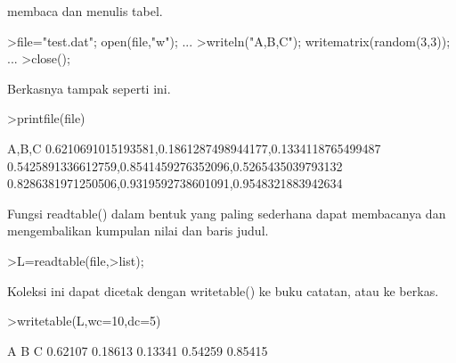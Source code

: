 \documentclass[a4paper,10pt]{article}
\begin{document}
\begin{eulernotebook}
\begin{eulercomment}
\begin{eulercomment}
\begin{eulercomment}
\begin{eulercomment}
\begin{eulercomment}
\begin{eulercomment}
\begin{eulercomment}
\begin{eulercomment}
\begin{eulercomment}
\begin{eulercomment}
\begin{eulercomment}
\begin{eulercomment}
\begin{eulercomment}
\begin{eulercomment}
\begin{eulercomment}
\begin{eulercomment}
\begin{eulercomment}
\begin{eulercomment}
\begin{eulercomment}
\begin{eulercomment}
\begin{eulercomment}
\begin{eulercomment}
\begin{eulercomment}
\begin{eulercomment}
\begin{eulercomment}
\begin{eulercomment}
\begin{eulercomment}
\begin{eulercomment}
\begin{eulercomment}
\begin{eulercomment}
\begin{eulercomment}
\begin{eulercomment}
\begin{eulercomment}
\begin{eulercomment}
\begin{eulercomment}
\begin{eulercomment}
\begin{eulercomment}
\begin{eulercomment}
\begin{eulercomment}
\begin{eulercomment}
\begin{eulercomment}
\begin{eulercomment}
\begin{eulercomment}
\begin{eulercomment}
\begin{eulercomment}
\begin{eulercomment}
\begin{eulercomment}
\begin{eulercomment}
\begin{eulercomment}
\begin{eulercomment}
\begin{eulercomment}
\begin{eulercomment}
\begin{eulercomment}
\begin{eulercomment}
\begin{eulercomment}
\begin{eulercomment}
\begin{eulercomment}
\begin{eulercomment}
\begin{eulercomment}
\begin{eulercomment}
\begin{eulercomment}
\begin{eulercomment}
\begin{eulercomment}
\begin{eulercomment}
\begin{eulercomment}
\begin{eulercomment}
\begin{eulercomment}
\begin{eulercomment}
\begin{eulercomment}
\begin{eulercomment}
\begin{eulercomment}
membaca dan menulis tabel.
\end{eulercomment}
\begin{eulerprompt}
>file="test.dat"; open(file,"w"); ...
>writeln("A,B,C"); writematrix(random(3,3)); ...
>close();
\end{eulerprompt}
\begin{eulercomment}
Berkasnya tampak seperti ini.
\end{eulercomment}
\begin{eulerprompt}
>printfile(file)
\end{eulerprompt}
\begin{euleroutput}
  A,B,C
  0.6210691015193581,0.1861287498944177,0.1334118765499487
  0.5425891336612759,0.8541459276352096,0.5265435039793132
  0.8286381971250506,0.9319592738601091,0.9548321883942634
  
\end{euleroutput}
\begin{eulercomment}
Fungsi readtable() dalam bentuk yang paling sederhana dapat membacanya
dan mengembalikan kumpulan nilai dan baris judul.
\end{eulercomment}
\begin{eulerprompt}
>L=readtable(file,>list);
\end{eulerprompt}
\begin{eulercomment}
Koleksi ini dapat dicetak dengan writetable() ke buku catatan, atau ke
berkas.
\end{eulercomment}
\begin{eulerprompt}
>writetable(L,wc=10,dc=5)
\end{eulerprompt}
\begin{euleroutput}
           A         B         C
     0.62107   0.18613   0.13341
     0.54259   0.85415   
\end{euleroutput}
\end{eulercomment}
\end{eulercomment}
\end{eulercomment}
\end{eulercomment}
\end{eulercomment}
\end{eulercomment}
\end{eulercomment}
\end{eulercomment}
\end{eulercomment}
\end{eulercomment}
\end{eulercomment}
\end{eulercomment}
\end{eulercomment}
\end{eulercomment}
\end{eulercomment}
\end{eulercomment}
\end{eulercomment}
\end{eulercomment}
\end{eulercomment}
\end{eulercomment}
\end{eulercomment}
\end{eulercomment}
\end{eulercomment}
\end{eulercomment}
\end{eulercomment}
\end{eulercomment}
\end{eulercomment}
\end{eulercomment}
\end{eulercomment}
\end{eulercomment}
\end{eulercomment}
\end{eulercomment}
\end{eulercomment}
\end{eulercomment}
\end{eulercomment}
\end{eulercomment}
\end{eulercomment}
\end{eulercomment}
\end{eulercomment}
\end{eulercomment}
\end{eulercomment}
\end{eulercomment}
\end{eulercomment}
\end{eulercomment}
\end{eulercomment}
\end{eulercomment}
\end{eulercomment}
\end{eulercomment}
\end{eulercomment}
\end{eulercomment}
\end{eulercomment}
\end{eulercomment}
\end{eulercomment}
\end{eulercomment}
\end{eulercomment}
\end{eulercomment}
\end{eulercomment}
\end{eulercomment}
\end{eulercomment}
\end{eulercomment}
\end{eulercomment}
\end{eulercomment}
\end{eulercomment}
\end{eulercomment}
\end{eulercomment}
\end{eulercomment}
\end{eulercomment}
\end{eulercomment}
\end{eulercomment}
\end{eulercomment}
\end{eulernotebook}
\end{document}
